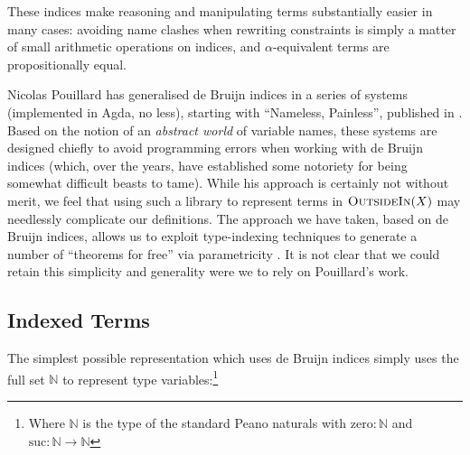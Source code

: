 \documentclass[a4paper]{jfp}
\newcommand{\outsidein}{\textsc{OutsideIn}(X)}
\begin{document}
These indices make reasoning and manipulating terms substantially easier in many cases: avoiding name clashes when rewriting constraints is simply a
matter of small arithmetic operations on indices, and $\alpha$-equivalent terms are propositionally equal.

Nicolas Pouillard has generalised de Bruijn indices in a series of systems (implemented in Agda, no less), starting with ``Nameless, Painless'',
published in \cite{Pouillard:2011hc}. Based on the notion of an \emph{abstract world} of variable names, these systems are designed chiefly to avoid
programming errors when working with de Bruijn indices (which, over the years, have established some notoriety for being somewhat difficult beasts to
tame). While his approach is certainly not without merit, we feel that using such a library to represent terms in $\outsidein$ may needlessly
complicate our definitions. The approach we have taken, based on de Bruijn indices, allows us to exploit type-indexing techniques to generate a number
of ``theorems for free'' via parametricity \cite{Wadler:1989vy}. It is not clear that we could retain this simplicity and generality were we to rely 
on Pouillard's work.

\pagebreak

\subsection{Indexed Terms}

The simplest possible representation which uses de Bruijn indices simply uses the full set $\mathbb{N}$ to represent type variables:\footnote{Where
   $\mathbb{N}$ is the type of the standard Peano naturals with $\text{zero} : \mathbb{N}$ and $\text{suc} : \mathbb{N} \rightarrow \mathbb{N}$}
\end{document}
